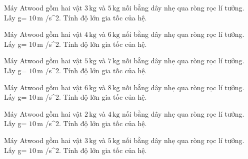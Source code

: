 \begin{ex}
Máy Atwood gồm hai vật $3\,\text{kg}$ và $5\,\text{kg}$ nối bằng dây nhẹ qua ròng rọc lí tưởng. Lấy g= $10\,\text{m}$ /s^2. Tính độ lớn gia tốc của hệ.
\end{ex}

\begin{ex}
Máy Atwood gồm hai vật $4\,\text{kg}$ và $6\,\text{kg}$ nối bằng dây nhẹ qua ròng rọc lí tưởng. Lấy g= $10\,\text{m}$ /s^2. Tính độ lớn gia tốc của hệ.
\end{ex}

\begin{ex}
Máy Atwood gồm hai vật $5\,\text{kg}$ và $7\,\text{kg}$ nối bằng dây nhẹ qua ròng rọc lí tưởng. Lấy g= $10\,\text{m}$ /s^2. Tính độ lớn gia tốc của hệ.
\end{ex}

\begin{ex}
Máy Atwood gồm hai vật $6\,\text{kg}$ và $8\,\text{kg}$ nối bằng dây nhẹ qua ròng rọc lí tưởng. Lấy g= $10\,\text{m}$ /s^2. Tính độ lớn gia tốc của hệ.
\end{ex}

\begin{ex}
Máy Atwood gồm hai vật $2\,\text{kg}$ và $4\,\text{kg}$ nối bằng dây nhẹ qua ròng rọc lí tưởng. Lấy g= $10\,\text{m}$ /s^2. Tính độ lớn gia tốc của hệ.
\end{ex}

\begin{ex}
Máy Atwood gồm hai vật $3\,\text{kg}$ và $5\,\text{kg}$ nối bằng dây nhẹ qua ròng rọc lí tưởng. Lấy g= $10\,\text{m}$ /s^2. Tính độ lớn gia tốc của hệ.
\end{ex}

